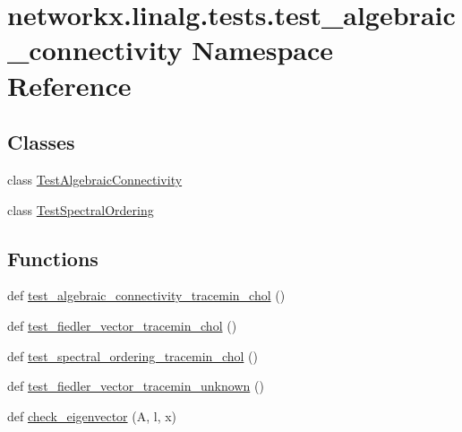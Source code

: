 \hypertarget{namespacenetworkx_1_1linalg_1_1tests_1_1test__algebraic__connectivity}{}\section{networkx.\+linalg.\+tests.\+test\+\_\+algebraic\+\_\+connectivity Namespace Reference}
\label{namespacenetworkx_1_1linalg_1_1tests_1_1test__algebraic__connectivity}
\subsection*{Classes}
\begin{DoxyCompactItemize}
\item 
class \hyperlink{classnetworkx_1_1linalg_1_1tests_1_1test__algebraic__connectivity_1_1TestAlgebraicConnectivity}{Test\+Algebraic\+Connectivity}
\item 
class \hyperlink{classnetworkx_1_1linalg_1_1tests_1_1test__algebraic__connectivity_1_1TestSpectralOrdering}{Test\+Spectral\+Ordering}
\end{DoxyCompactItemize}
\subsection*{Functions}
\begin{DoxyCompactItemize}
\item 
def \hyperlink{namespacenetworkx_1_1linalg_1_1tests_1_1test__algebraic__connectivity_af2bc7774166fa8c49c697ab45f1f0a2c}{test\+\_\+algebraic\+\_\+connectivity\+\_\+tracemin\+\_\+chol} ()
\item 
def \hyperlink{namespacenetworkx_1_1linalg_1_1tests_1_1test__algebraic__connectivity_aa253695c57954ab8abf9fcb1005813cf}{test\+\_\+fiedler\+\_\+vector\+\_\+tracemin\+\_\+chol} ()
\item 
def \hyperlink{namespacenetworkx_1_1linalg_1_1tests_1_1test__algebraic__connectivity_ad8a345f474607c39ec57427cda87de0f}{test\+\_\+spectral\+\_\+ordering\+\_\+tracemin\+\_\+chol} ()
\item 
def \hyperlink{namespacenetworkx_1_1linalg_1_1tests_1_1test__algebraic__connectivity_a58e709dbfe5c9922ef804af8cc8a3421}{test\+\_\+fiedler\+\_\+vector\+\_\+tracemin\+\_\+unknown} ()
\item 
def \hyperlink{namespacenetworkx_1_1linalg_1_1tests_1_1test__algebraic__connectivity_aea523366ee12d774fe4ea15e4082528d}{check\+\_\+eigenvector} (A, l, x)
\end{DoxyCompactItemize}
